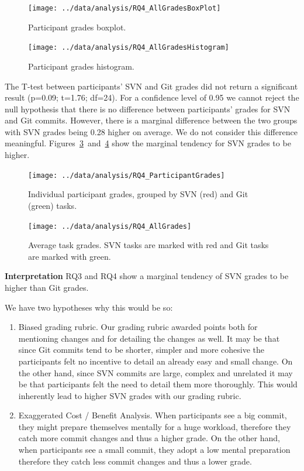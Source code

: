 \documentclass[letterpaper]{article}
\begin{document}
\begin{figure}[H]
    \centering
    \texttt{[image: ../data/analysis/RQ4\_AllGradesBoxPlot]}
    \caption{Participant grades boxplot.}
    \label{fig:rq4-allParticipantsBox}
\end{figure}

\begin{figure}[H]
    \centering
    \texttt{[image: ../data/analysis/RQ4\_AllGradesHistogram]}
    \caption{Participant grades histogram.}
    \label{fig:rq4-allParticipantsHist}
\end{figure}

The T-test between participants' SVN and Git grades did not return a significant result (p=0.09; t=1.76; df=24). 
For a confidence level of 0.95 we cannot reject the null hypothesis that there is no difference between participants' grades for SVN and Git commits.
However, there is a marginal difference between the two groups with SVN grades being 0.28 higher on average.
We do not consider this difference meaningful.
Figures~\ref{fig:rq4-participantGrades}~and~\ref{fig:rq4-taskGrades} show the marginal tendency for SVN grades to be higher.

\begin{figure}[H]
    \centering
    \texttt{[image: ../data/analysis/RQ4\_ParticipantGrades]}
    \caption{Individual participant grades, grouped by SVN (red) and Git (green) tasks.}
    \label{fig:rq4-participantGrades}
\end{figure}

\begin{figure}[H]
    \centering
    \texttt{[image: ../data/analysis/RQ4\_AllGrades]}
    \caption{Average task grades. SVN tasks are marked with red and Git tasks are marked with green.}
    \label{fig:rq4-taskGrades}
\end{figure}

\textbf{Interpretation}
RQ3 and RQ4 show a marginal tendency of SVN grades to be higher than Git grades.

We have two hypotheses why this would be so:
\begin{enumerate}
		\item{Biased grading rubric.}
			Our grading rubric awarded points both for mentioning changes and for detailing the changes as well.
			It may be that since Git commits tend to be shorter, simpler and more cohesive the participants felt no incentive to detail an already easy and small change.
			On the other hand, since SVN commits are large, complex and unrelated it may be that participants felt the need to detail them more thoroughly.
			This would inherently lead to higher SVN grades with our grading rubric.
	\item{Exaggerated Cost / Benefit Analysis.}
			When participants see a big commit, they might prepare themselves mentally for a huge workload, therefore they catch more commit changes and thus a higher grade. 
			On the other hand, when participants see a small commit, they adopt a low mental preparation therefore they catch less commit changes and thus a lower grade.
\end{enumerate}
\end{document}
